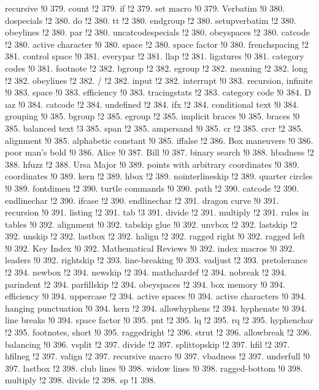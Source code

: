 recursive !0 379.
count !2 379.
if !2 379.
set macro !0 379.
Verbatim !0 380.
dospecials !2 380.
do !2 380.
tt !2 380.
endgroup !2 380.
setupverbatim !2 380.
obeylines !2 380.
par !2 380.
uncatcodespecials !2 380.
obeyspaces !2 380.
catcode !2 380.
active character !0 380.
space !2 380.
space factor !0 380.
frenchspacing !2 381.
control space !0 381.
everypar !2 381.
llap !2 381.
ligatures !0 381.
category codes !0 381.
footnote !2 382.
bgroup !2 382.
egroup !2 382.
meaning !2 382.
long !2 382.
obeylines !2 382.
/ !2 382.
input !2 382.
interrupt !0 383.
recursion, infinite !0 383.
space !0 383.
efficiency !0 383.
tracingstats !2 383.
category code !0 384.
D{ \i }az !0 384.
catcode !2 384.
undefined !2 384.
ifx !2 384.
conditional text !0 384.
grouping !0 385.
bgroup !2 385.
egroup !2 385.
implicit braces !0 385.
braces !0 385.
balanced text !3 385.
span !2 385.
ampersand !0 385.
cr !2 385.
crcr !2 385.
alignment !0 385.
alphabetic constant !0 385.
iffalse !2 386.
Box maneuvers !0 386.
poor man's bold !0 386.
Alice !0 387.
Bill !0 387.
binary search !0 388.
hbadness !2 388.
hfuzz !2 388.
Ursa Major !0 389.
points with arbitrary coordinates !0 389.
coordinates !0 389.
kern !2 389.
hbox !2 389.
nointerlineskip !2 389.
quarter circles !0 389.
fontdimen !2 390.
turtle commands !0 390.
path !2 390.
catcode !2 390.
endlinechar !2 390.
ifcase !2 390.
endlinechar !2 391.
dragon curve !0 391.
recursion !0 391.
listing !2 391.
tab !3 391.
divide !2 391.
multiply !2 391.
rules in tables !0 392.
alignment !0 392.
tabskip glue !0 392.
unvbox !2 392.
lastskip !2 392.
unskip !2 392.
lastbox !2 392.
halign !2 392.
ragged right !0 392.
ragged left !0 392.
Key Index !0 392.
Mathematical Reviews !0 392.
index macros !0 392.
leaders !0 392.
rightskip !2 393.
line-breaking !0 393.
vadjust !2 393.
pretolerance !2 394.
newbox !2 394.
newskip !2 394.
mathchardef !2 394.
nobreak !2 394.
parindent !2 394.
parfillskip !2 394.
obeyspaces !2 394.
box memory !0 394.
efficiency !0 394.
uppercase !2 394.
active spaces !0 394.
active characters !0 394.
hanging punctuation !0 394.
kern !2 394.
allowhyphens !2 394.
hyphenate !0 394.
line breaks !0 394.
space factor !0 395.
pnt !2 395.
lq !2 395.
rq !2 395.
hyphenchar !2 395.
footnotes, short !0 395.
raggedright !2 396.
strut !2 396.
allowbreak !2 396.
balancing !0 396.
vsplit !2 397.
divide !2 397.
splittopskip !2 397.
hfil !2 397.
hfilneg !2 397.
valign !2 397.
recursive macro !0 397.
vbadness !2 397.
underfull !0 397.
lastbox !2 398.
club lines !0 398.
widow lines !0 398.
ragged-bottom !0 398.
multiply !2 398.
divide !2 398.
sp !1 398.
